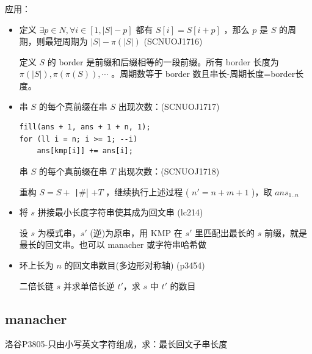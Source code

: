 \documentclass[twocolumn,10pt]{ctexart}
\begin{document}
\inputminted{cpp}{code/ext_057.cpp}

应用：

\begin{itemize}
\item 定义 $\exists p\in N,\allowbreak{}\forall i\in [1,\allowbreak{}|S|-p]$ 都有 $S[i]=S[i+p]$ ，那么 $p$ 是 $S$ 的周期，则最短周期为 $|S|-\pi(|S|)$ (SCNUOJ1716)

定义 $S$ 的 border 是前缀和后缀相等的一段前缀。所有 border 长度为 $\pi(|S|),\pi(\pi(S)),\cdots$ 。周期数等于 border 数且串长-周期长度=border长度。
\end{itemize}

\begin{itemize}
\item 串 $S$ 的每个真前缀在串 $S$ 出现次数：(SCNUOJ1717)

\begin{verbatim}
fill(ans + 1, ans + 1 + n, 1);
for (ll i = n; i >= 1; --i)
    ans[kmp[i]] += ans[i];
\end{verbatim}

串 $S$ 的每个真前缀在串 $T$ 出现次数：(SCNUOJ1718)

重构 $S=S+$ \texttt|#| $+T$ ，继续执行上述过程 ( $n'=n+m+1$ )，取 $ans_{1..n}$
\end{itemize}

\begin{itemize}
\item 将 $s$ 拼接最小长度字符串使其成为回文串 (lc214)

设 $s$ 为模式串，$s'$ (逆)为原串，用 KMP 在 $s'$ 里匹配出最长的 $s$ 前缀，就是最长的回文串。也可以 manacher 或字符串哈希做
\end{itemize}

\begin{itemize}
\item 环上长为 $n$ 的回文串数目(多边形对称轴)  (p3454)

二倍长链 $s$ 并求单倍长逆 $t'$，求 $s$ 中 $t'$ 的数目
\end{itemize}

\subsection{manacher}

\begin{notebox}
洛谷P3805-只由小写英文字符组成，求：最长回文子串长度
\end{notebox}

\inputminted{cpp}{code/ext_058.cpp}
\end{document}

